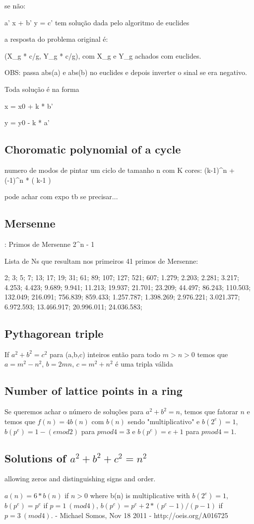 \documentclass{article}
\begin{document}
se não:

a' x + b' y = c' tem solução dada pelo algoritmo de euclides

a resposta do problema original é:

(X_g * c/g, Y_g * c/g), com X_g e Y_g achados com euclides.

OBS: passa abs(a) e abs(b) no euclides e depois inverter o sinal
se era negativo.

Toda solução é na forma

x = x0 + k * b'

y = y0 - k * a'

\subsection{Choromatic polynomial of a cycle}

numero de modos de pintar um ciclo de tamanho n com K cores: (k-1)^n + (-1)^n * ( k-1 )

pode achar com expo tb se precisar...


\subsection{Mersenne}:
Primos de Mersenne 2^n - 1

Lista de Ns que resultam nos primeiros 41 primos de Mersenne:

2; 3; 5; 7; 13; 17; 19; 31; 61; 89; 107; 127; 521; 607; 1.279; 2.203; 2.281; 3.217; 4.253; 4.423; 9.689; 9.941; 11.213; 19.937; 21.701; 23.209; 44.497; 86.243; 110.503; 132.049; 216.091; 756.839; 859.433; 1.257.787; 1.398.269; 2.976.221; 3.021.377; 6.972.593; 13.466.917; 20.996.011; 24.036.583;


\subsection{Pythagorean triple}
If $a^2 +  b^2 = c^2$ para (a,b,c) inteiros então para todo $m>n>0$ temos que $a = m^2 - n^2$, $b=2mn$, $c = m^2 + n^2$ é uma tripla válida

\subsection{Number of lattice points in a ring}
Se queremos achar o número de soluções para $a^2 + b^2 = n$, temos que fatorar $n$ e temos que $f(n) = 4b(n)$ com $b(n)$ sendo "multiplicativo" e $b(2^e) = 1$, $b(p^e) = 1 - (e mod 2)$ para $p mod 4 = 3$ e $b(p^e) = e+1$ para $p mod 4 = 1$.

\subsection{Solutions of $a^2+b^2+c^2 = n^2$}
allowing zeros and distinguishing signs and order.

$a(n) = 6 * b(n)$ if $n>0$ where b(n) is multiplicative with $b(2^e) = 1$, $b(p^e) = p^e$ if $p = 1 \ (mod 4)$, $b(p^e) = p^e + 2 * (p^e - 1) / (p - 1)$ if $p = 3 \  (mod 4)$. - Michael Somos, Nov 18 2011 - http://oeis.org/A016725
\end{document}
